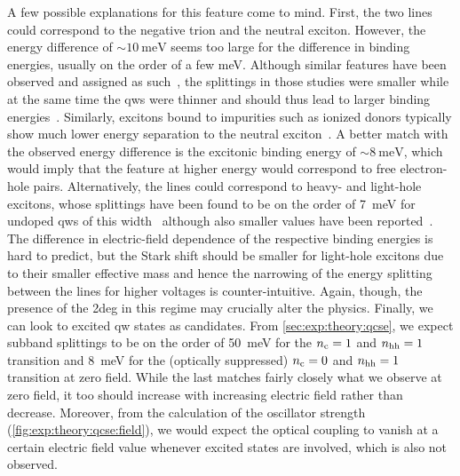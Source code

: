 A few possible explanations for this feature come to mind.
First, the two lines could correspond to the negative trion and the neutral exciton.
However, the energy difference of $\sim\qty{10}{\milli\electronvolt}$ seems too large for the difference in binding energies, usually on the order of a few \unit{\milli\electronvolt}.
Although similar features have been observed and assigned as such~\cite{Brown1996,Huard2000,Yusa2000}, the splittings in those studies were smaller while at the same time the \glspl{qw} were thinner and should thus lead to larger binding energies~\cite{Esser2000,Esser2001}.
Similarly, excitons bound to impurities such as ionized donors typically show much lower energy separation to the neutral exciton~\cite{Essaoudi2001}.
A better match with the observed energy difference is the excitonic binding energy of $\sim\qty{8}{\milli\electronvolt}$, which would imply that the feature at higher energy would correspond to free electron-hole pairs.
Alternatively, the lines could correspond to heavy- and light-hole excitons, whose splittings have been found to be on the order of \qty{7}{\milli\electronvolt} for undoped \glspl{qw} of this width~\cite{ElKhalifi1989} although also smaller values have been reported~\cite{Bataev2022}.
The difference in electric-field dependence of the respective binding energies is hard to predict, but the Stark shift should be smaller for light-hole excitons due to their smaller effective mass and hence the narrowing of the energy splitting between the lines for higher voltages is counter-intuitive.
Again, though, the presence of the \gls{2deg} in this regime may crucially alter the physics.
Finally, we can look to excited \gls{qw} states as candidates.
From \cref{sec:exp:theory:qcse}, we expect subband splittings to be on the order of \qty{50}{\milli\electronvolt} for the $n_{\mathrm{c}}=1$ and $n_{\mathrm{hh}}=1$ transition and \qty{8}{\milli\electronvolt} for the (optically suppressed) $n_{\mathrm{c}}=0$ and $n_{\mathrm{hh}}=1$ transition at zero field.
While the last matches fairly closely what we observe at zero field, it too should increase with increasing electric field rather than decrease.
Moreover, from the calculation of the oscillator strength (\cref{fig:exp:theory:qcse:field}), we would expect the optical coupling to vanish at a certain electric field value whenever excited states are involved, which is also not observed.

